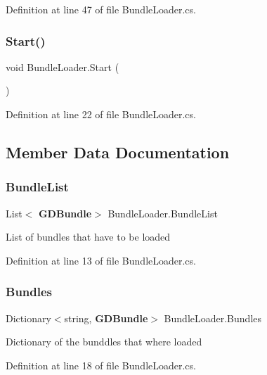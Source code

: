 Definition at line 47 of file Bundle\+Loader.\+cs.

\mbox{\label{class_bundle_loader_ac6baf5774872896927ceca39d78ac7a1}} 
\subsubsection{Start()}
{\footnotesize\ttfamily void Bundle\+Loader.\+Start (\begin{DoxyParamCaption}{ }\end{DoxyParamCaption})}



Definition at line 22 of file Bundle\+Loader.\+cs.



\subsection{Member Data Documentation}
\mbox{\label{class_bundle_loader_a59a3c862f318c9d34d52c14a9163b992}} 
\subsubsection{Bundle\+List}
{\footnotesize\ttfamily List$<$\textbf{ G\+D\+Bundle}$>$ Bundle\+Loader.\+Bundle\+List}



List of bundles that have to be loaded 



Definition at line 13 of file Bundle\+Loader.\+cs.

\mbox{\label{class_bundle_loader_a0ef45688094bb5507d0d297e8975325a}} 
\subsubsection{Bundles}
{\footnotesize\ttfamily Dictionary$<$string, \textbf{ G\+D\+Bundle}$>$ Bundle\+Loader.\+Bundles}



Dictionary of the bunddles that where loaded 



Definition at line 18 of file Bundle\+Loader.\+cs.

